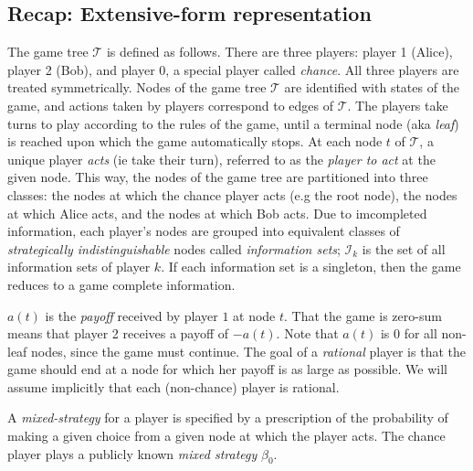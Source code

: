 \documentclass{article} %
\begin{document}
\subsection{Recap: Extensive-form representation} The game tree $\mathcal{T}$ is defined as follows. There are three players: player 1 (Alice), player 2 (Bob), and player 0, a special player called \textit{chance}. All three players are treated symmetrically. Nodes of the game tree $\mathcal{T}$ are identified with states of the game, and actions taken by players correspond to edges of $\mathcal{T}$.
The players take turns to play according to the rules of the game, until a terminal node (aka \textit{leaf}) is reached upon which the game automatically stops. %
At each node $t$ of $\mathcal{T}$, a unique player \textit{acts} (ie take their turn), referred to as the \textit{player to act} at the given node. This way, the nodes of the game tree are partitioned into three classes: the nodes at which the chance player acts (e.g the root node), the nodes at which Alice acts, and the nodes at which Bob acts. Due to imcompleted information, each player's nodes are grouped into equivalent classes of \textit{strategically indistinguishable} nodes called \textit{information sets}; $\mathcal{I}_k$ is the set of all information sets of player $k$. If each information set is a singleton, then the game reduces to a game complete information.

$a(t)$ is the \textit{payoff} received by player $1$ at node $t$. That the game is zero-sum means that player 2
receives a payoff of $-a(t)$. Note that $a(t)$ is $0$ for all non-leaf nodes, since the game must continue.
The goal of a \textit{rational} player is that the game should end at a node for which her payoff is as large as possible.
We will assume implicitly that each (non-chance) player is rational.


A \textit{mixed-strategy} for a player is specified by a prescription of the probability of making a given choice from a given node at which the player acts. The chance player plays a publicly known \textit{mixed strategy} $\beta_0$.
\end{document}
